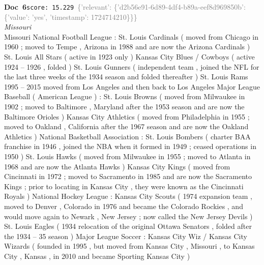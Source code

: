 \documentclass[a4paper,11pt]{article}
\begin{document}
\begin{docenv}
{\footnotesize\textcolor{doccolor}{\textbf{Doc~6}}}\hfill{\tiny\texttt{score:~15.229}}\ {\tiny\textcolor{gray}{\{'relevant': \{'d2b56e91-6d89-4df4-b89a-eef8d969850b': \{'value': 'yes', 'timestamp': 1724714210\}\}\}}}\\[3pt]
{\small\textit{Missouri}}\\[2pt]
\vspace{2pt}
{\footnotesize Missouri
National Football League : St. Louis Cardinals ( moved from Chicago in 1960 ; moved to Tempe , Arizona in 1988 and are now the Arizona Cardinals ) St. Louis All Stars ( active in 1923 only ) Kansas City Blues / Cowboys ( active 1924 -- 1926 , folded ) St. Louis Gunners ( independent team , joined the NFL for the last three weeks of the 1934 season and folded thereafter ) St. Louis Rams 1995 -- 2015 moved from Los Angeles and then back to Los Angeles Major League Baseball ( American League ) : St. Louis Browns ( moved from Milwaukee in 1902 ; moved to Baltimore , Maryland after the 1953 season and are now the Baltimore Orioles ) Kansas City Athletics ( moved from Philadelphia in 1955 ; moved to Oakland , California after the 1967 season and are now the Oakland Athletics ) National Basketball Association : St. Louis Bombers ( charter BAA franchise in 1946 , joined the NBA when it formed in 1949 ; ceased operations in 1950 ) St. Louis Hawks ( moved from Milwaukee in 1955 ; moved to Atlanta in 1968 and are now the Atlanta Hawks ) Kansas City Kings ( moved from Cincinnati in 1972 ; moved to Sacramento in 1985 and are now the Sacramento Kings ; prior to locating in Kansas City , they were known as the Cincinnati Royals ) National Hockey League : Kansas City Scouts ( 1974 expansion team , moved to Denver , Colorado in 1976 and became the Colorado Rockies , and would move again to Newark , New Jersey ; now called the New Jersey Devils ) St. Louis Eagles ( 1934 relocation of the original Ottawa Senators , folded after the 1934 -- 35 season ) Major League Soccer : Kansas City Wiz / Kansas City Wizards ( founded in 1995 , but moved from Kansas City , Missouri , to Kansas City , Kansas , in 2010 and became Sporting Kansas City )}
\end{docenv}
\end{document}
